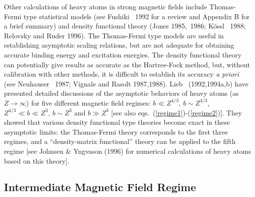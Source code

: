 Other calculations of heavy atoms in strong magnetic fields include
Thomas-Fermi type statistical models (see Fushiki \etal~1992
for a review and Appendix B for a brief summary) 
and density functional theory (Jones 1985,~1986;
K\"ossl \etal~1988; Relovsky and Ruder 1996). 
The Thomas-Fermi type models are useful in establishing asymptotic scaling
relations, but are not adequate for obtaining accurate binding energy
and excitation energies. The density functional theory can potentially 
give results as accurate as the Hartree-Fock method, but, without 
calibration with other methods, it is difficult to establish its 
accuracy {\it a priori} (see Neuhauser \etal~1987; Vignale and Rasolt
1987,1988). Lieb \etal~(1992,1994a,b) have presented detailed
discussions of the asymptotic behaviors of heavy atoms (as
$Z\rightarrow\infty$) for five different magnetic field regimes: $b\ll
Z^{4/3}$, $b\sim Z^{4/3}$, $Z^{4/3}\ll b\ll Z^3$, $b\sim Z^3$ and $b\gg Z^3$
[see also eqs.~(\ref{regime1})-(\ref{regime2})]. They showed that various
density functional type theories become exact in these asymptotic limits: 
the Thomas-Fermi theory corresponds to the first three regimes, and 
a ``density-matrix functional'' theory can be applied to the fifth regime
[see Johnsen \& Yngvason (1996) for numerical calculations of heavy atoms 
based on this theory].


\subsection{Intermediate Magnetic Field Regime}

